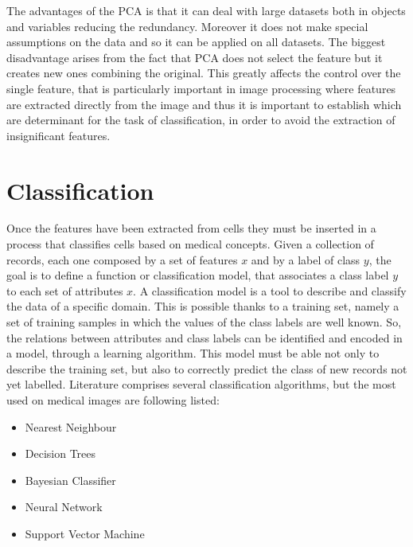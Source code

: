 \documentclass[final,a4paper,12pt,english]{UnicaPhdThesis3}
\begin{document}
The advantages of the PCA is that it can deal with large datasets both in objects and variables reducing the redundancy. Moreover it does not make special assumptions on the data and so it can be applied on all datasets. The biggest disadvantage arises from the fact that PCA does not select the feature but it creates new ones combining the original. This greatly affects the control over the single feature, that is particularly important in image processing where features are extracted directly from the image and thus it is important to establish which are determinant for the task of classification, in order to avoid the extraction of insignificant features.  

\chapter{Classification}
Once the features have been extracted from cells they must be inserted in a process that classifies cells based on medical concepts. Given a collection of records, each one composed by a set of features $x$ and by a label of class $y$, the goal is to define a function or classification model, that associates a class label $y$ to each set of attributes $x$. A classification model is a tool to describe and classify the data of a specific domain. This is possible thanks to a training set, namely a set of training samples in which the values ​​of the class labels are well known. So, the relations between attributes and class labels can be identified and encoded in a model, through a learning algorithm. This model must be able not only to describe the training set, but also to correctly predict the class of new records not yet labelled. Literature comprises several classification algorithms, but the most used on medical images are following listed:
\begin{itemize}
\item Nearest Neighbour
\item Decision Trees
\item Bayesian Classifier	
\item Neural Network
\item Support Vector Machine
\end{itemize}
\end{document}
